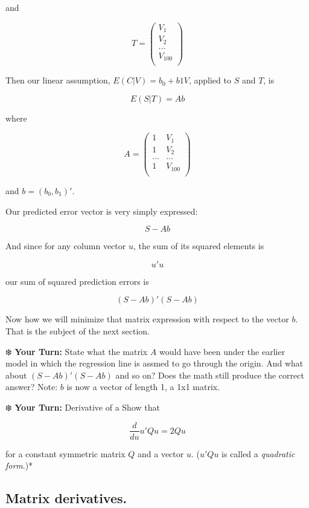 \documentclass[
  letterpaper,
  DIV=11,
  numbers=noendperiod,
  oneside]{scrreprt}
\begin{document}
and

\[
T = 
 \left (
 \begin{array}{rr}
 V_1 \\
 V_2 \\
 ... \\
 V_{100} \\
 \end{array}
 \right )
\]

Then our linear assumption, \(E(C | V) = b_0 + b1 V\), applied to \(S\)
and \(T\), is

\[
E(S | T) =
A b
\]

where

\[
A =  
 \left (
 \begin{array}{rrrr}
 1 & V_1 \\
 1 & V_2 \\
 ... & ... \\
 1 & V_{100} \\
 \end{array}
 \right )
\]

and \(b = (b_0,b_1)'.\)

Our predicted error vector is very simply expressed:

\[
S - Ab
\]

And since for any column vector \(u\), the sum of its squared elements
is

\[
u'u
\]

our sum of squared prediction errors is

\[
(S - Ab)'(S - Ab)
\]

Now how we will minimize that matrix expression with respect to the
vector \(b\). That is the subject of the next section.

❄️ \textbf{Your Turn:} State what the matrix \(A\) would have been under
the earlier model in which the regression line is assmed to go through
the origin. And what about \((S - Ab)'(S - Ab)\) and so on? Does the
math still produce the correct answer? Note: \(b\) is now a vector of
length 1, a 1x1 matrix.

❄️ \textbf{Your Turn:} Derivative of a Show that

\[
\frac{d}{du} u'Qu = 2Qu
\]

for a constant symmetric matrix \(Q\) and a vector \(u\). (\(u'Qu\) is
called a \emph{quadratic form}.)*

\hypertarget{matrix-derivatives.}{%
\subsection{Matrix derivatives.}\label{matrix-derivatives.}}
\end{document}
